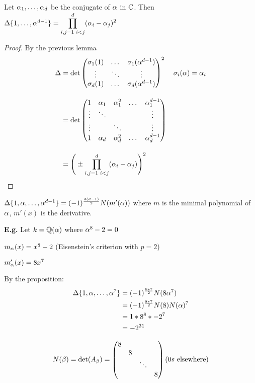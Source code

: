 \documentclass[11pt]{article}
\begin{document}
\begin{prop}
	Let $\alpha_1, \dots, \alpha_d$ be the conjugate of $\alpha$ in $\mathbb{C}$. Then $\Delta \{1, \dots, \alpha^{d-1} \} = \displaystyle \prod^{d}_{i,j = 1 \text{ }\\ i<j} (\alpha_i - \alpha_j)^2$
\end{prop}

\begin{proof}
By the previous lemma
	\begin{align*}
		\Delta &= \det \begin{pmatrix}
			\sigma_1(1) &\dots & \sigma_1(\alpha^{d-1})\\
			\vdots & \ddots & \vdots \\
			\sigma_d(1) &\dots & \sigma_d(\alpha^{d-1})
		\end{pmatrix}^2 && \sigma_i(\alpha) = \alpha_i\\[1em]
		&= \det \begin{pmatrix}
			1 & \alpha_1 & \alpha_1^2 & \dots & \alpha_1^{d-1}\\
			\vdots &\ddots & &&\vdots\\
			\vdots & &\ddots &&\vdots\\
			1 & \alpha_d & \alpha_d^2 & \dots & \alpha_d^{d-1}
		\end{pmatrix}\\[1em]
		& = \Bigg( \pm \prod^d_{i,j = 1 \text{ }i<j} (\alpha_i - \alpha_j)\Bigg)^2
	\end{align*}
\end{proof}

\begin{prop}
	$\Delta \{1,\alpha, \dots, \alpha^{d-1} \} = (-1)^{\frac{d(d-1)}{2}} N(m'(\alpha))$ where $m$ is the minimal polynomial of $\alpha$, $m'(x)$ is the derivative.
\end{prop}
\spa
\textbf{E.g.} Let $k = \mathbb{Q}(\alpha)$ where $\alpha^8 - 2 = 0$
\spa

$m_\alpha(x) = x^8-2$ \hspace{7pt} (Eisenstein's criterion with $p=2$)
\spa

$m_\alpha'(x) = 8x^7$
\spa

By the proposition:
\begin{align*}
	\Delta \{1, \alpha, \dots, \alpha^7 \} &= (-1)^{\frac{8*7}{2}} N(8\alpha^7)\\
	&=  (-1)^{\frac{8*7}{2}} N(8)N(\alpha)^7\\
	&= 1 * 8^8 * -2^7\\
	&= -2^{31}
\end{align*}

\begin{align*}
	N(\beta) = \det(A_\beta) = \begin{pmatrix}
		8 & & &\\
		& 8 & &\\
		&&\ddots & \\
		&&&8
	\end{pmatrix} \text{(0}s \text{ elsewhere)}
\end{align*}
\end{document}
